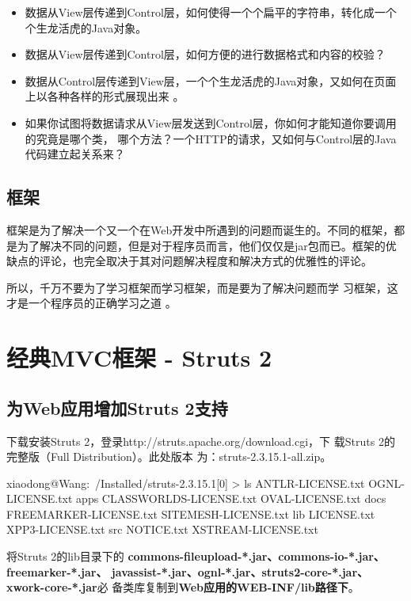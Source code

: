 \begin{itemize}
\item 数据从View层传递到Control层，如何使得一个个扁平的字符串，转化成一个个生龙活虎的Java对象。
\item 数据从View层传递到Control层，如何方便的进行数据格式和内容的校验？ 
\item 数据从Control层传递到View层，一个个生龙活虎的Java对象，又如何在页面上以各种各样的形式展现出来 。
\item 如果你试图将数据请求从View层发送到Control层，你如何才能知道你要调用的究竟是哪个类，
  哪个方法？一个HTTP的请求，又如何与Control层的Java代码建立起关系来？
\end{itemize}

\subsection{框架}

框架是为了解决一个又一个在Web开发中所遇到的问题而诞生的。不同的框架，都
是为了解决不同的问题，但是对于程序员而言，他们仅仅是jar包而已。框架的优
缺点的评论，也完全取决于其对问题解决程度和解决方式的优雅性的评论。

所以，{\hei\Blue 千万不要为了学习框架而学习框架，而是要为了解决问题而学
  习框架，这才是一个程序员的正确学习之道 。}

\section{经典MVC框架 - Struts 2}

\subsection{为Web应用增加Struts 2支持}

下载安装Struts 2，登录http://struts.apache.org/download.cgi，下
载Struts 2的完整版（Full Distribution）。此处版本
为：struts-2.3.15.1-all.zip。

\begin{shCode}
  [18:10]xiaodong@Wang:~/Installed/struts-2.3.15.1[0]
  > ls
  ANTLR-LICENSE.txt       OGNL-LICENSE.txt        apps
  CLASSWORLDS-LICENSE.txt OVAL-LICENSE.txt        docs
  FREEMARKER-LICENSE.txt  SITEMESH-LICENSE.txt    lib
  LICENSE.txt             XPP3-LICENSE.txt        src
  NOTICE.txt              XSTREAM-LICENSE.txt
\end{shCode}

将Struts 2的lib目录下的{\Red\bf
  commons-fileupload-*.jar、commons-io-*.jar、freemarker-*.jar、
  javassist-*.jar、ognl-*.jar、struts2-core-*.jar、xwork-core-*.jar}必
备类库复制到{\bf\Red Web应用的WEB-INF/lib路径下}。

